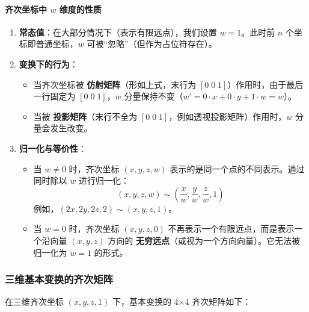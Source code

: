 \documentclass[12pt]{article}
\begin{document}
\paragraph{齐次坐标中 $w$ 维度的性质}
\begin{enumerate}
    \item \textbf{常态值}：在大部分情况下（表示有限远点），我们设置 $w=1$。此时前 $n$ 个坐标即普通坐标，$w$ 可被“忽略”（但作为占位符存在）。
    \item \textbf{变换下的行为}：
    \begin{itemize}
        \item 当齐次坐标被 \textbf{仿射矩阵}（形如上式，末行为 $[0\;0\;1]$）作用时，由于最后一行固定为 $[0\;0\;1]$，$w$ 分量保持不变（$w' = 0\cdot x + 0\cdot y + 1\cdot w = w$）。
        \item 当被 \textbf{投影矩阵}（末行不全为 $[0\;0\;1]$，例如透视投影矩阵）作用时，$w$ 分量会发生改变。
    \end{itemize}
    \item \textbf{归一化与等价性}：
    \begin{itemize}
        \item 当 $w \neq 0$ 时，齐次坐标 $(x, y, z, w)$ 表示的是同一个点的不同表示。通过同时除以 $w$ 进行归一化：
        \[
        (x, y, z, w) \sim \left( \frac{x}{w}, \frac{y}{w}, \frac{z}{w}, 1 \right)
        \]
        例如，$(2x, 2y, 2z, 2) \sim (x, y, z, 1)$。
        \item 当 $w = 0$ 时，齐次坐标 $(x, y, z, 0)$ 不再表示一个有限远点，而是表示一个沿向量 $(x, y, z)$ 方向的 \textbf{无穷远点}（或视为一个方向向量）。它无法被归一化为 $w=1$ 的形式。
    \end{itemize}
\end{enumerate}

\subsubsection{三维基本变换的齐次矩阵}

在三维齐次坐标 $(x, y, z, 1)$ 下，基本变换的 4×4 齐次矩阵如下：
\end{document}
